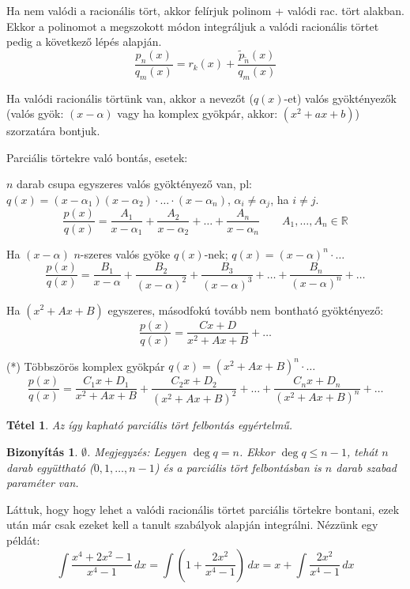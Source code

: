 \documentclass[a4paper,12pt,twoside]{book}
\newtheorem{tetel}{Tétel}[chapter]
\theoremstyle{break}
\newtheorem{biz}{Bizonyítás}[chapter]
\theoremstyle{plain}
\newcommand{\integ}[1]{\ensuremath{\int #1\, dx}}
\begin{document}
\begin{list}{.}{\leftmargin=1.5em}
\begin{list}{)}{\leftmargin=1.5em}
    \item Ha nem valódi a racionális tört, akkor felírjuk polinom + valódi rac. tört alakban. Ekkor a polinomot a megszokott módon integráljuk a valódi racionális törtet pedig a következő lépés alapján.
      \[\frac{p_n(x)}{q_m(x)} = r_k(x) + \frac{\tilde{p}_{\tilde{n}}(x)}{q_m(x)}\]
    \item Ha valódi racionális törtünk van, akkor a nevezőt ($q(x)$-et) valós gyöktényezők (valós gyök: $(x-\alpha)$ vagy ha komplex gyökpár, akkor: $(x^2+ax+b)$) szorzatára bontjuk.
    \item Parciális törtekre való bontás, esetek:
    \begin{list}{)}{\leftmargin=1.5em}
      \item $n$ darab csupa egyszeres valós gyöktényező van, pl: $q(x)=(x-\alpha_1)(x-\alpha_2)\cdot\ldots\cdot(x-\alpha_n)$, $\alpha_i \neq \alpha_j$, ha $i\neq j$.
      \[\frac{p(x)}{q(x)} = \frac{A_1}{x-\alpha_1}+\frac{A_2}{x-\alpha_2}+\ldots+\frac{A_n}{x-\alpha_n} \qquad A_1,\ldots,A_n\in\mathbb{R}\]
      \item Ha $(x-\alpha)$ $n$-szeres valós gyöke $q(x)$-nek; $q(x)=(x-\alpha)^n\cdot\ldots$
      \[\frac{p(x)}{q(x)} = \frac{B_1}{x-\alpha}+\frac{B_2}{(x-\alpha)^2}+\frac{B_3}{(x-\alpha)^3}+\ldots+\frac{B_n}{(x-\alpha)^n}+\ldots\]
      \item Ha $(x^2+Ax+B)$ egyszeres, másodfokú tovább nem bontható gyöktényező:
      \[\frac{p(x)}{q(x)} = \frac{Cx+D}{x^2+Ax+B}+\ldots\]
      \item (*) Többszörös komplex gyökpár $q(x)=(x^2+Ax+B)^n\cdot\ldots$
      \[\frac{p(x)}{q(x)} = \frac{C_1x+D_1}{x^2+Ax+B}+\frac{C_2x+D_2}{(x^2+Ax+B)^2}+\ldots+\frac{C_nx+D_n}{(x^2+Ax+B)^n}+\ldots\]
    \end{list}
  \end{list}
  \begin{tetel}
   Az így kapható parciális tört felbontás egyértelmű.
  \end{tetel}
  \begin{biz}
    $\emptyset$. Megjegyzés: Legyen $\deg q = n$. Ekkor $\deg q \leqslant n-1$, tehát $n$ darab együttható ($0, 1, \ldots, n-1$) és a parciális tört felbontásban is $n$ darab szabad paraméter van.
  \end{biz}
  Láttuk, hogy hogy lehet a valódi racionális törtet parciális törtekre bontani, ezek után már csak ezeket kell a tanult szabályok alapján integrálni. Nézzünk egy példát:
   \[\integ{\frac{x^4+2x^2-1}{x^4-1}} = \integ{\left(1+\frac{2x^2}{x^4-1}\right)} = x+\integ{\frac{2x^2}{x^4-1}}\]

\end{list}
\end{document}
